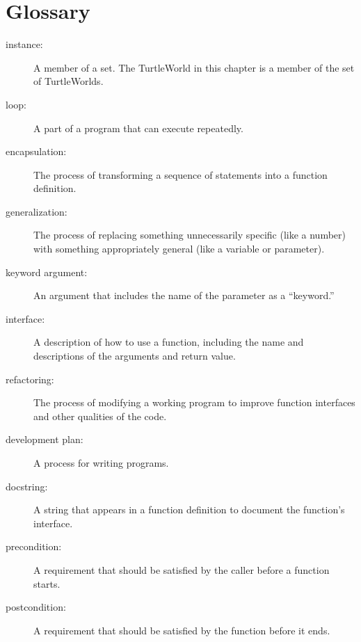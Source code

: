\documentclass[10pt]{book}
\begin{document}
\section{Glossary}

\begin{description}

\item[instance:] A member of a set.  The TurtleWorld in this
chapter is a member of the set of TurtleWorlds.

\item[loop:] A part of a program that can execute repeatedly.

\item[encapsulation:] The process of transforming a sequence of
statements into a function definition.

\item[generalization:] The process of replacing something
unnecessarily specific (like a number) with something appropriately
general (like a variable or parameter).

\item[keyword argument:] An argument that includes the name of
the parameter as a ``keyword.''

\item[interface:] A description of how to use a function, including
the name and descriptions of the arguments and return value.

\item[refactoring:] The process of modifying a working program to
  improve function interfaces and other qualities of the code.

\item[development plan:] A process for writing programs.

\item[docstring:]  A string that appears in a function definition
to document the function's interface.

\item[precondition:] A requirement that should be satisfied by
the caller before a function starts.

\item[postcondition:] A requirement that should be satisfied by
the function before it ends.

\end{description}
\end{document}
